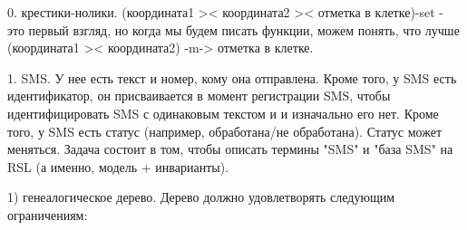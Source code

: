 \documentclass[14pt, twoside]{extreport}
\newcounter{problem_type}[chapter]
\newcounter{zadacha}[problem_type]
\newcommand{\z}{\vspace{0.5cm}\par\addtocounter{zadacha}{1}%
\textit{\arabic{chapter}.\arabic{problem_type}.\arabic{zadacha}}~~  }
\begin{document}




%
%

0. крестики-нолики.  (координата1 >< координата2 >< отметка в клетке)-set - это первый взгляд, но когда мы будем писать функции, можем понять, что лучше (координата1 >< координата2) -m-> отметка в клетке.

1. SMS. У нее есть текст и номер, кому она отправлена. Кроме того, у SMS есть идентификатор, он присваивается в момент регистрации SMS, чтобы идентифицировать SMS с одинаковым текстом и  и изначально его нет. Кроме того, у SMS есть статус (например, обработана/не обработана). Статус может меняться. Задача состоит в том, чтобы описать термины "SMS" и "база SMS" на RSL (а именно, модель + инварианты).

1) генеалогическое дерево. Дерево должно удовлетворять следующим ограничениям:
\end{document}
